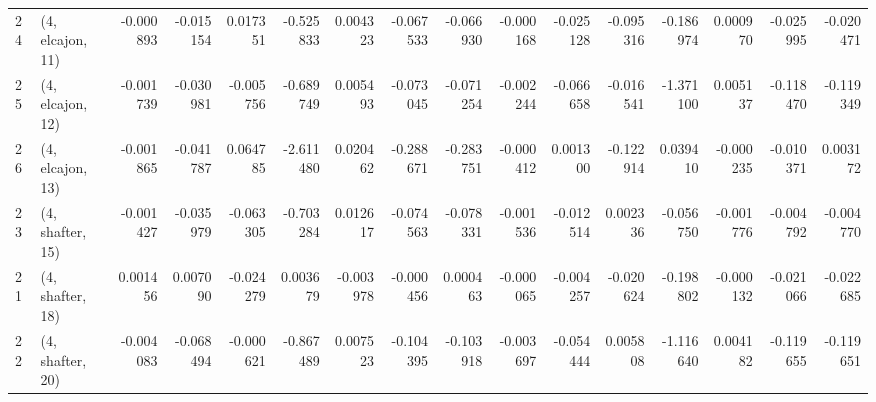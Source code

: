 \begin{tabular}{llrrrrrrrrrrrrrr}
24 &  (4, elcajon, 11) &  -0.000893 & -0.015154 &  0.017351 &  -0.525833 &  0.004323 &  -0.067533 & -0.066930 & -0.000168 & -0.025128 & -0.095316 &  -0.186974 &  0.000970 & -0.025995 & -0.020471 \\
25 &  (4, elcajon, 12) &  -0.001739 & -0.030981 & -0.005756 &  -0.689749 &  0.005493 &  -0.073045 & -0.071254 & -0.002244 & -0.066658 & -0.016541 &  -1.371100 &  0.005137 & -0.118470 & -0.119349 \\
26 &  (4, elcajon, 13) &  -0.001865 & -0.041787 &  0.064785 &  -2.611480 &  0.020462 &  -0.288671 & -0.283751 & -0.000412 &  0.001300 & -0.122914 &   0.039410 & -0.000235 & -0.010371 &  0.003172 \\
23 &  (4, shafter, 15) &  -0.001427 & -0.035979 & -0.063305 &  -0.703284 &  0.012617 &  -0.074563 & -0.078331 & -0.001536 & -0.012514 &  0.002336 &  -0.056750 & -0.001776 & -0.004792 & -0.004770 \\
21 &  (4, shafter, 18) &   0.001456 &  0.007090 & -0.024279 &   0.003679 & -0.003978 &  -0.000456 &  0.000463 & -0.000065 & -0.004257 & -0.020624 &  -0.198802 & -0.000132 & -0.021066 & -0.022685 \\
22 &  (4, shafter, 20) &  -0.004083 & -0.068494 & -0.000621 &  -0.867489 &  0.007523 &  -0.104395 & -0.103918 & -0.003697 & -0.054444 &  0.005808 &  -1.116640 &  0.004182 & -0.119655 & -0.119651 \\
\bottomrule
\end{tabular}

